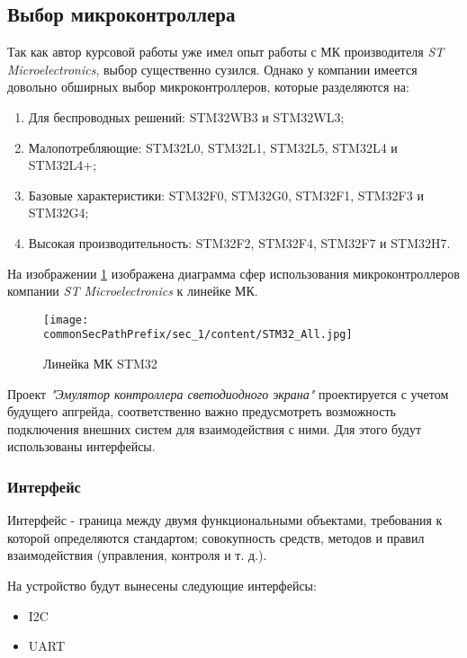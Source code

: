 \subsection{Выбор микроконтроллера}

Так как автор курсовой работы уже имел опыт работы с МК производителя \textit{ST Microelectronics}, выбор существенно сузился. Однако у компании имеется довольно обширных выбор микроконтроллеров\cite{stm32_mcus}, которые разделяются на:
\begin{enumerate}
    \item Для беспроводных решений: STM32WB3 и STM32WL3;
    \item Малопотребляющие:  STM32L0, STM32L1,  STM32L5, STM32L4 и STM32L4+;
    \item Базовые характеристики: STM32F0, STM32G0, STM32F1, STM32F3 и STM32G4;
    \item Высокая производительность: STM32F2, STM32F4, STM32F7 и STM32H7.
\end{enumerate}

На изображении \ref{fig:stm32_options} изображена диаграмма сфер использования микроконтроллеров компании \textit{ST Microelectronics} к линейке МК.
\begin{figure}[ht]
    \centering
    \texttt{[image: \\commonSecPathPrefix/sec\_1/content/STM32\_All.jpg]}
    \caption{Линейка МК STM32}
    \label{fig:stm32_options}
\end{figure}

Проект \textit{"Эмулятор контроллера светодиодного экрана"} проектируется с учетом будущего апгрейда, соответственно важно предусмотреть возможность подключения внешних систем для взаимодействия с ними. Для этого будут использованы интерфейсы.

\subsubsection{Интерфейс}

Интерфейс - граница между двумя функциональными объектами, требования к которой определяются стандартом; совокупность средств, методов и правил взаимодействия (управления, контроля и т. д.).

На устройство будут вынесены следующие интерфейсы:
\begin{itemize}
    \item I2C
    \item UART
\end{itemize}

